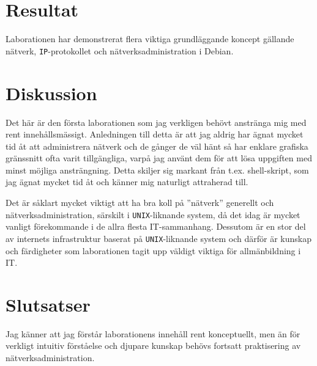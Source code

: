 %
%
%


\section{Resultat}
Laborationen har demonstrerat flera viktiga grundläggande koncept gällande
nätverk, \texttt{IP}-protokollet och nätverksadministration i Debian.

\section{Diskussion}
Det här är den första laborationen som jag verkligen behövt anstränga mig med
rent innehållsmässigt. Anledningen till detta är att jag aldrig har ägnat mycket
tid åt att administrera nätverk och de gånger de väl hänt så har enklare grafiska
gränssnitt ofta varit tillgängliga, varpå jag använt dem för att lösa uppgiften
med minst möjliga ansträngning. Detta skiljer sig markant från t.ex. shell-skript, 
som jag ägnat mycket tid åt och känner mig naturligt attraherad till.

Det är såklart mycket viktigt att ha bra koll på ''nätverk'' generellt och
nätverksadministration, särskilt i \texttt{UNIX}-liknande system, då det idag
är mycket vanligt förekommande i de allra flesta IT-sammanhang. Dessutom är en
stor del av internets infrastruktur baserat på \texttt{UNIX}-liknande system
och därför är kunskap och färdigheter som laborationen tagit upp väldigt
viktiga för allmänbildning i IT.


\section{Slutsatser}
Jag känner att jag förstår laborationens innehåll rent konceptuellt, men än för
verkligt intuitiv förståelse och djupare kunskap behövs fortsatt praktisering
av nätverksadministration.
